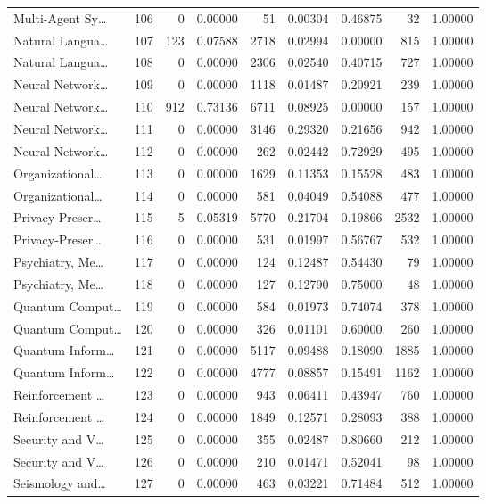 \begin{table}
\begin{tabular}{lrrrrrrrr}
Multi-Agent Sy… & 106 & 0 & 0.00000 & 51 & 0.00304 & 0.46875 & 32 & 1.00000 \\
Natural Langua… & 107 & 123 & 0.07588 & 2718 & 0.02994 & 0.00000 & 815 & 1.00000 \\
Natural Langua… & 108 & 0 & 0.00000 & 2306 & 0.02540 & 0.40715 & 727 & 1.00000 \\
Neural Network… & 109 & 0 & 0.00000 & 1118 & 0.01487 & 0.20921 & 239 & 1.00000 \\
Neural Network… & 110 & 912 & 0.73136 & 6711 & 0.08925 & 0.00000 & 157 & 1.00000 \\
Neural Network… & 111 & 0 & 0.00000 & 3146 & 0.29320 & 0.21656 & 942 & 1.00000 \\
Neural Network… & 112 & 0 & 0.00000 & 262 & 0.02442 & 0.72929 & 495 & 1.00000 \\
Organizational… & 113 & 0 & 0.00000 & 1629 & 0.11353 & 0.15528 & 483 & 1.00000 \\
Organizational… & 114 & 0 & 0.00000 & 581 & 0.04049 & 0.54088 & 477 & 1.00000 \\
Privacy-Preser… & 115 & 5 & 0.05319 & 5770 & 0.21704 & 0.19866 & 2532 & 1.00000 \\
Privacy-Preser… & 116 & 0 & 0.00000 & 531 & 0.01997 & 0.56767 & 532 & 1.00000 \\
Psychiatry, Me… & 117 & 0 & 0.00000 & 124 & 0.12487 & 0.54430 & 79 & 1.00000 \\
Psychiatry, Me… & 118 & 0 & 0.00000 & 127 & 0.12790 & 0.75000 & 48 & 1.00000 \\
Quantum Comput… & 119 & 0 & 0.00000 & 584 & 0.01973 & 0.74074 & 378 & 1.00000 \\
Quantum Comput… & 120 & 0 & 0.00000 & 326 & 0.01101 & 0.60000 & 260 & 1.00000 \\
Quantum Inform… & 121 & 0 & 0.00000 & 5117 & 0.09488 & 0.18090 & 1885 & 1.00000 \\
Quantum Inform… & 122 & 0 & 0.00000 & 4777 & 0.08857 & 0.15491 & 1162 & 1.00000 \\
Reinforcement … & 123 & 0 & 0.00000 & 943 & 0.06411 & 0.43947 & 760 & 1.00000 \\
Reinforcement … & 124 & 0 & 0.00000 & 1849 & 0.12571 & 0.28093 & 388 & 1.00000 \\
Security and V… & 125 & 0 & 0.00000 & 355 & 0.02487 & 0.80660 & 212 & 1.00000 \\
Security and V… & 126 & 0 & 0.00000 & 210 & 0.01471 & 0.52041 & 98 & 1.00000 \\
Seismology and… & 127 & 0 & 0.00000 & 463 & 0.03221 & 0.71484 & 512 & 1.00000 \\

\end{tabular}
\end{table}
